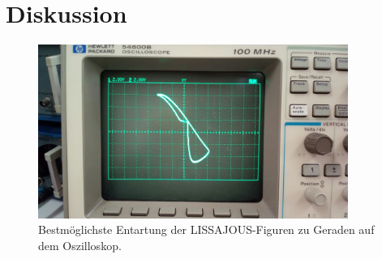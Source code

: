 \section{Diskussion}
\label{sec:Diskussion}
\begin{figure}
	\includegraphics[width=0.9\textwidth]{Bilder/lissajou.jpeg}
	\caption{Bestmöglichste Entartung der LISSAJOUS-Figuren zu Geraden auf dem Oszilloskop.}
	\label{fig:Lisas}
\end{figure}

